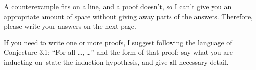 A counterexample fits on a line, and a proof doesn't, so I can't give you an appropriate
amount of space without giving away parts of the answers.
Therefore, please write your answers on the next page.

If you need to write one or more proofs, I suggest following the
language of Conjecture 3.1: ``For all \dots, \dots'' and the form of that proof:
say what you are inducting on, state the induction hypothesis, and give all necessary
detail.

\clearpage

\



